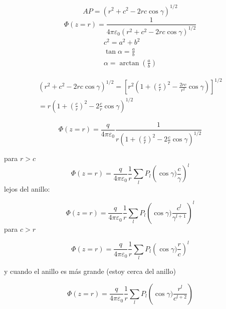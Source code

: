 \documentclass{article}
\begin{document}
\begin{equation}
    AP = (r^2 + c^2 - 2rc\cos \gamma)^{1/2}
\end{equation}
\begin{equation}
    \Phi(z=r) = \frac{1}{4\pi \varepsilon_0 (r^2 + c^2 - 2rc\cos \gamma)^{1/2}}
\end{equation}
\begin{equation}
    \begin{gathered}
    c^2 = a^2 + b^2 \\
    \tan \alpha = \frac{a}{b}\\
    \alpha = \arctan \left( \frac{a}{b}\right )
    \end{gathered}
\end{equation}

\begin{equation}
    \begin{gathered}
    (r^2 + c^2 - 2rc\cos\gamma)^{1/2} = \left [r^2(1 + \left(\frac{c}{r}\right)^2 - \frac{2{r}c}{r^{2}} \cos \gamma ) \right]^{1/2} \\
    = r (1 + \left(\frac{c}{r} \right )^2 - 2 \frac{c}{r}\cos\gamma )^{1/2}
    \end{gathered}
\end{equation}

\begin{equation}
    \Phi(z = r) = \frac{q}{4\pi\varepsilon_0} \frac{1}{ r (1 + \left(\frac{c}{r} \right )^2 - 2 \frac{c}{r}\cos\gamma )^{1/2} }
\end{equation}

para $r > c$
\begin{equation}
    \Phi(z = r) = \frac{q}{4\pi\varepsilon_0} \frac{1}{r} \sum_l P_l \left(\cos \gamma) \frac{c}{\gamma}\right)^l 
\end{equation}
lejos del anillo:

\begin{equation}
    \Phi(z = r) = \frac{q}{4\pi\varepsilon_0} \frac{1}{r} \sum_l P_l \left(\cos \gamma) \frac{c^l}{\gamma^{l+1}}\right)^l 
\end{equation}
para $c > r$

\begin{equation}
    \Phi(z = r) = \frac{q}{4\pi\varepsilon_0} \frac{1}{r} \sum_l P_l \left(\cos \gamma) \frac{r}{c}\right)^l 
\end{equation}

y cuando el anillo es más grande (estoy cerca del anillo)


\begin{equation}
    \Phi(z = r) = \frac{q}{4\pi\varepsilon_0} \frac{1}{r} \sum_l P_l \left(\cos \gamma) \frac{r^l}{c^{l+2}}\right) 
\end{equation}
\end{document}
